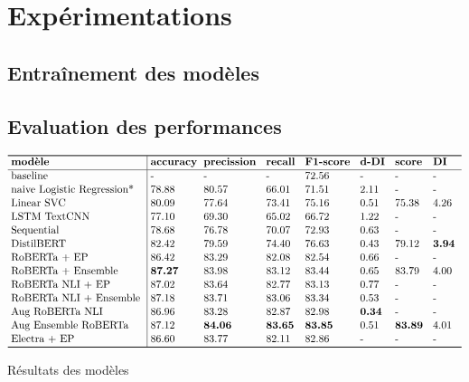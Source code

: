 \chapter{Expérimentations}

\section{Entraînement des modèles}
\label{sec:sample-section}

\section{Evaluation des performances}

\begin{table}[ht!]
    $$\vbox{
    \offinterlineskip
    \halign{
    \strut
    \vrule height1ex depth1ex width0px #
    &\kern3pt #\hfil\kern3pt\vrule
    &\kern3pt #\hfil\kern3pt
    &\kern3pt #\hfil\kern3pt
    &\kern3pt #\hfil\kern3pt
    &\kern3pt #\hfil\kern3pt
    &\kern3pt #\hfil\kern3pt
    &\kern3pt #\hfil\kern3pt
    &\kern3pt #\hfil\kern3pt
    \cr
    \noalign{\hrule height0.8pt}
     & \textbf{modèle}                      & \textbf{accuracy}& \textbf{precission} & \textbf{recall} & \textbf{F1-score} & \textbf{d-DI} & \textbf{score}  & \textbf{DI}  \cr
    \noalign{\hrule}
     & baseline                   & -        & -          & -      & 72.56    & -       & -   & -                       \cr
     & naive Logistic Regression* & 78.88    & 80.57      & 66.01  & 71.51    & 2.11    & -   & -                       \cr
     & Linear SVC                 & 80.09    & 77.64      & 73.41  & 75.16    & 0.51    & 75.38 & 4.26                  \cr
     & LSTM TextCNN               & 77.10    & 69.30      & 65.02  & 66.72    & 1.22    & -   & -                       \cr
     & Sequential                 & 78.68    & 76.78      & 70.07  & 72.93    & 0.63    & -   & -                       \cr
     & DistilBERT                 & 82.42    & 79.59      & 74.40  & 76.63    & 0.43    & 79.12 & \textbf{3.94}         \cr
     & RoBERTa + EP               & 86.42    & 83.29      & 82.08  & 82.54    & 0.66    & -   & -                       \cr
     & RoBERTa + Ensemble         & \textbf{87.27} & 83.98      & 83.12  & 83.44    & 0.65    & 83.79  & 4.00           \cr
     & RoBERTa NLI + EP           & 87.02    & 83.64      & 82.77  & 83.13    & 0.77    & -   & -                      \cr
     & RoBERTa NLI + Ensemble     & 87.18    & 83.71      & 83.06  & 83.34    & 0.53    & -   & -                       \cr
     & Aug RoBERTa NLI            & 86.96    & 83.28      & 82.87  & 82.98    & \textbf{0.34} & -  & -                           \cr
     & Aug Ensemble RoBERTa       & 87.12    & \textbf{84.06} & \textbf{83.65} & \textbf{83.85} & 0.51  & \textbf{83.89}    & 4.01    \cr
     & Electra + EP               & 86.60    & 83.77      & 82.11  & 82.86    & -       & -   & -                     \cr
    \noalign{\hrule height0.8pt}
    }
    }$$
    \caption{Résultats des modèles}
    \label{table:1}
    \end{table}


